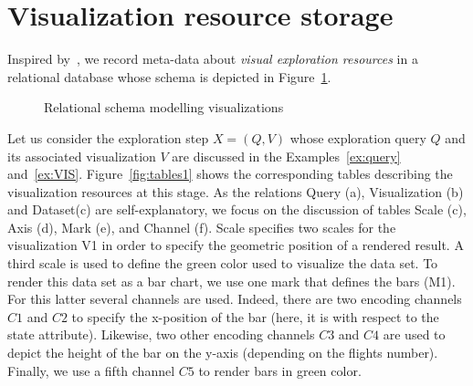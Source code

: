 \section{Visualization resource storage}
Inspired by~\cite{WuPMZR17}, we record meta-data about \emph{visual exploration resources} in a relational database whose schema is depicted in Figure~\ref{fig:VisSchema}.
 
 
  \begin{figure}[t]
\centering
\caption{Relational schema modelling visualizations}
\label{fig:VisSchema}
\end{figure}
 
 
\begin{example}
\label{ex:vis-resource}
Let us consider the exploration step $X=(Q,V)$ whose exploration query $Q$ and its associated visualization $V$ are discussed  in the Examples~\ref{ex:query} and~\ref{ex:VIS}.
 Figure~\ref{fig:tables1} shows the corresponding tables describing the visualization resources at this stage. As the relations Query (a), Visualization (b) and Dataset(c) are self-explanatory, we focus on the discussion of tables Scale (c), Axis (d), Mark (e), and Channel (f). Scale specifies two scales for the visualization V1 in order to specify the geometric position of a rendered result. A third scale is used to define the green color used to visualize the data set. 
 To render this data set as a bar chart, we use one mark that defines the bars (M1). For this latter several channels are used. Indeed, there are two encoding channels $C1$ and $C2$ to specify the x-position of the bar (here, it is with respect to the state attribute).
 Likewise, two other encoding channels $C3$ and $C4$ are used to depict the height of the bar on the y-axis (depending on the flights number). Finally, we use a fifth channel $C5$ to render bars in green color.  
\end{example}


